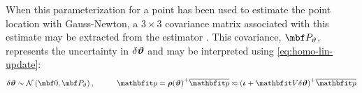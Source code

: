 \documentclass[11pt,a4,oneside]{article}
\begin{document}
When this parameterization for a point has been used to estimate the point location with Gauss-Newton, a $3 \times 3$ covariance matrix associated with this estimate may be extracted from the estimator \citep{Bell9300}. This covariance, $\mbf P_{\vartheta}$, represents the uncertainty in ${\delta {\boldsymbol{\vartheta}}}$ and may be interpreted using \eqref{eq:homo-lin-update}:
\begin{equation}
  \label{eq:homo-uncertainty}
  \mbsdel \vartheta \sim \mathcal{N}\left(\mbf 0, \mbf P_{\vartheta} \right), \hspace{1cm}\mbfh p = \qc{\mbs \rho(\mbs \vartheta)} \mbfhbar p \approx \qc{ \left( \mbs \iota +  \mbfh V \mbsdel \vartheta \right) }\mbfhbar p
\end{equation}


\end{document}
